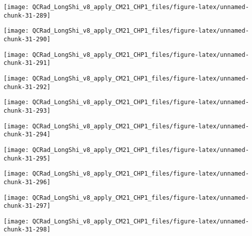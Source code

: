 \documentclass[
  10pt,
  a4paper,oneside]{article}
\begin{document}
\begin{center}\texttt{[image: QCRad\_LongShi\_v8\_apply\_CM21\_CHP1\_files/figure-latex/unnamed-chunk-31-289]} \end{center}

\begin{center}\texttt{[image: QCRad\_LongShi\_v8\_apply\_CM21\_CHP1\_files/figure-latex/unnamed-chunk-31-290]} \end{center}

\begin{center}\texttt{[image: QCRad\_LongShi\_v8\_apply\_CM21\_CHP1\_files/figure-latex/unnamed-chunk-31-291]} \end{center}

\begin{center}\texttt{[image: QCRad\_LongShi\_v8\_apply\_CM21\_CHP1\_files/figure-latex/unnamed-chunk-31-292]} \end{center}

\begin{center}\texttt{[image: QCRad\_LongShi\_v8\_apply\_CM21\_CHP1\_files/figure-latex/unnamed-chunk-31-293]} \end{center}

\begin{center}\texttt{[image: QCRad\_LongShi\_v8\_apply\_CM21\_CHP1\_files/figure-latex/unnamed-chunk-31-294]} \end{center}

\begin{center}\texttt{[image: QCRad\_LongShi\_v8\_apply\_CM21\_CHP1\_files/figure-latex/unnamed-chunk-31-295]} \end{center}

\begin{center}\texttt{[image: QCRad\_LongShi\_v8\_apply\_CM21\_CHP1\_files/figure-latex/unnamed-chunk-31-296]} \end{center}

\begin{center}\texttt{[image: QCRad\_LongShi\_v8\_apply\_CM21\_CHP1\_files/figure-latex/unnamed-chunk-31-297]} \end{center}

\begin{center}\texttt{[image: QCRad\_LongShi\_v8\_apply\_CM21\_CHP1\_files/figure-latex/unnamed-chunk-31-298]} \end{center}
\end{document}
